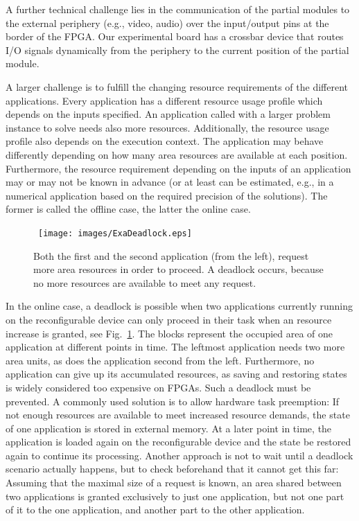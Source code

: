 \documentclass[10pt,journal]{IEEEtran}
\begin{document}
A further technical challenge lies in the communication of the partial
modules to the external periphery (e.g., video, audio) over the
input/output pins at the border of the FPGA.
Our experimental board has a
crossbar device that routes I/O signals dynamically from the
periphery to the current position of the partial module.

A larger challenge is to fulfill the changing resource requirements of
the different applications. Every application has a different resource
usage profile which depends on the inputs specified. An application
called with a larger problem instance to solve needs also more
resources. Additionally, the resource usage profile also depends on
the execution context. The application may behave differently
depending on how many area resources are available at each position.
Furthermore, the resource requirement depending on the
inputs of an application may or may not be known in advance (or at least can be
estimated, e.g., in a numerical application based on the required
precision of the solutions). The former is called the offline case,
the latter the online case.

\begin{figure}[t]
        \centering ~\qquad\texttt{[image: images/ExaDeadlock.eps]}
        \caption{Both the first and the second application (from the
          left), request more area resources in order to proceed. A
          deadlock occurs, because no more resources are available to
          meet any request.\newline~} \label{fig:deadlock}
\end{figure}


In the online case, a deadlock is possible when two applications currently
running on the reconfigurable device can only proceed in their task
when an resource increase is granted, see
Fig.~\ref{fig:deadlock}. The blocks represent the occupied area of one
application at different points in time. The leftmost application 
needs two more area units, as does the application second from the
left. Furthermore, no application can give up its accumulated
resources, as saving and restoring states is widely considered too
expensive on FPGAs. Such a deadlock must be prevented. 
A commonly used solution is to allow hardware task preemption: If not
enough resources are available to meet increased resource demands, the
state of one application is stored in external memory. At a
later point in time, the application is loaded again on the
reconfigurable device and the state be restored again to continue its
processing. 
Another approach is not to wait until a deadlock scenario
actually happens, but to check beforehand that it cannot get this
far: Assuming that the maximal size of a request is known,
an area shared between two applications is
granted exclusively to just one application, but not one part of it to
the one application, and another part to the other application.
\end{document}
